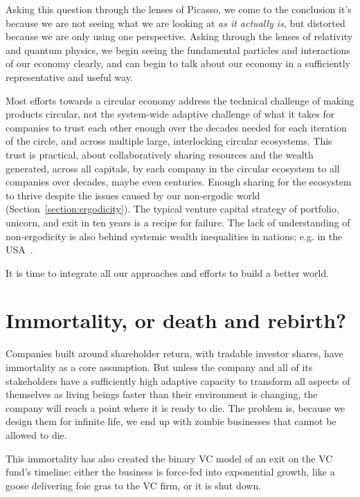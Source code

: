Asking this question through the lenses of Picasso, we come to the conclusion it's because we are not seeing what we are looking at \emph{as it actually is}, but distorted because we are only using one perspective. Asking through the lenses of relativity and quantum physics, we begin seeing the fundamental particles and interactions of our economy clearly, and can begin to talk about our economy in a sufficiently representative and useful way.


Most efforts towards a circular economy address the technical challenge of making products circular, not the system-wide adaptive challenge of what it takes for companies to trust each other enough over the decades needed for each iteration of the circle, and across multiple large, interlocking circular ecosystems. This trust is practical, about collaboratively sharing resources and the wealth generated, across all capitals, by each company in the circular ecosystem to all companies over decades, maybe even centuries. Enough sharing for the ecosystem to thrive despite the issues caused by our non-ergodic world (Section~\ref{section:ergodicity}). The typical venture capital strategy of  portfolio, unicorn, and exit in ten years is a recipe for failure. The lack of understanding of non-ergodicity is also behind systemic wealth inequalities in nations; e.g. in the USA~\cite{berman-wealth}.


It is time to integrate all our approaches and efforts to build a better world. 


\section{Immortality, or death and rebirth?}
\label{section:immortality-or-death}
Companies built around shareholder return, with tradable investor shares, have immortality as a core assumption. But unless the company and all of its stakeholders have a sufficiently high adaptive capacity to transform all aspects of themselves as living beings faster than their environment is changing, the company will reach a point where it is ready to die. The problem is, because we design them for infinite life, we end up with zombie businesses that cannot be allowed to die.


This immortality has also created the binary VC model of an exit on the VC fund's timeline: either the business is force-fed into exponential growth, like a goose delivering foie gras to the VC firm, or it is shut down. 


